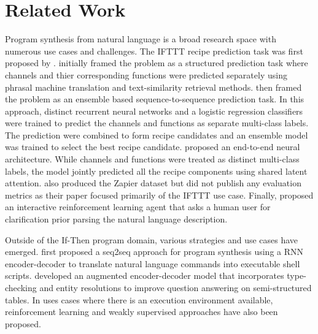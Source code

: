 \documentclass[letterpaper]{article} %
\begin{document}
\section{Related Work}
Program synthesis from natural language is a broad research space with numerous use cases and challenges. The IFTTT recipe prediction task was first proposed by \citeauthor{quirk-etal-2015-language}. \citeauthor{quirk-etal-2015-language} initially framed the problem as a structured prediction task where channels and thier corresponding functions were predicted separately using phrasal machine translation and text-similarity retrieval methods. \citeauthor{beltagy-quirk-2016-improved} \citeyear{beltagy-quirk-2016-improved} then framed the problem as an ensemble based sequence-to-sequence prediction task. In this approach, distinct recurrent neural networks and a logistic regression classifiers were trained to predict the channels and functions as separate multi-class labels. The prediction were combined to form recipe candidates and an ensemble model was trained to select the best recipe candidate. \citeauthor{chen2016latent} \citeyear{chen2016latent} proposed an end-to-end neural architecture. While channels and functions were treated as distinct multi-class labels, the model jointly predicted all the recipe components using shared latent attention. \cite{chen2016latent} also produced the Zapier dataset but did not publish any evaluation metrics as their paper focused primarily of the IFTTT use case. Finally, \citeauthor{DBLP:journals/corr/abs-1808-06740} \citeyear{DBLP:journals/corr/abs-1808-06740} proposed an interactive reinforcement learning agent that asks a human user for clarification prior parsing the natural language description.

Outside of the If-Then program domain, various strategies and use cases have emerged. \citeauthor{Lin2017ProgramSF} \citeyear{Lin2017ProgramSF} first proposed a seq2seq approach for program synthesis using a RNN encoder-decoder to translate natural language commands into executable shell scripts. \citeauthor{krishnamurthy-etal-2017-neural} \citeyear{krishnamurthy-etal-2017-neural} developed an augmented encoder-decoder model that incorporates type-checking and entity resolutions to improve question answering on semi-structured tables. In uses cases where there is an execution environment available, reinforcement learning and weakly supervised approaches have also been proposed. 
\end{document}
